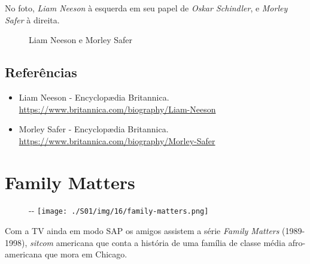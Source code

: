 No foto, \emph{Liam Neeson} à esquerda em seu papel de \emph{Oskar
Schindler}, e \emph{Morley Safer} à direita.

\begin{figure}
  \centering
    \caption{Liam Neeson e Morley Safer\label{fig:liam-neeson-e-morley-safer}}
\end{figure}

\hypertarget{referuxeancias-1}{%
\subsection{Referências}\label{referuxeancias-1}}

\begin{itemize}
\tightlist
\item
  \sloppy Liam Neeson - Encyclopædia Britannica. \url{https://www.britannica.com/biography/Liam-Neeson}
\item
  \sloppy Morley Safer - Encyclopædia Britannica. \url{https://www.britannica.com/biography/Morley-Safer}
\end{itemize}

\hypertarget{family-matters}{%
\section{Family Matters}\label{family-matters}}

\begin{figure}[!ht]
  \begin{adjustwidth}{-\oddsidemargin-1in}{-\rightmargin}
    \centering
    \texttt{[image: ./S01/img/16/family-matters.png]}
  \end{adjustwidth}
\end{figure}

Com a TV ainda em modo SAP os amigos assistem a série \emph{Family
Matters} (1989-1998), \emph{sitcom} americana que conta a história de
uma família de classe média afro-americana que mora em Chicago.

